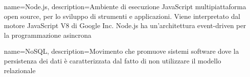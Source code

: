 {
	name=Node.js,
	description={Ambiente di esecuzione JavaScript multipiattaforma open source, per lo sviluppo di strumenti e applicazioni. Viene interpretato dal motore JavaScript V8 di Google Inc. Node.js ha un'architettura event-driven per la programmazione asincrona}
}

{
	name=NoSQL,
	description={Movimento che promuove sistemi software dove la persistenza dei dati è caratterizzata dal fatto di non utilizzare il modello relazionale}
}